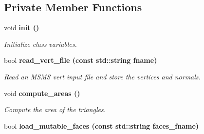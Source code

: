 \subsection*{Private Member Functions}
\begin{CompactItemize}
\item 
void \bf{init} ()\label{classASCbase_1_1geometry_1_1SimpleTrimeshTwo_5f901fae358571cee8e66c7f4480e4f6}

\begin{CompactList}\small\item\em Initialize class variables. \item\end{CompactList}\item 
bool \bf{read\_\-vert\_\-file} (const std::string fname)\label{classASCbase_1_1geometry_1_1SimpleTrimeshTwo_32143f4bf17902caa35ffd5951dd9b95}

\begin{CompactList}\small\item\em Read an MSMS vert input file and store the vertices and normals. \item\end{CompactList}\item 
void \bf{compute\_\-areas} ()\label{classASCbase_1_1geometry_1_1SimpleTrimeshTwo_46ee622d183ec4cdf3f7b37e490e8c45}

\begin{CompactList}\small\item\em Compute the area of the triangles. \item\end{CompactList}\item 
bool \bf{load\_\-mutable\_\-faces} (const std::string faces\_\-fname)
\end{CompactItemize}
